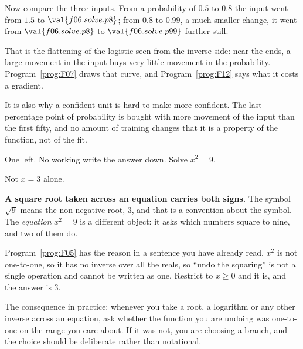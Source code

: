 \begin{fr}
Now compare the three inputs. From a probability of $\num{0.5}$ to
$\num{0.8}$ the input went from $\num{1.5}$ to $\val{f06.solve.p8}$; from
$\num{0.8}$ to $\num{0.99}$, a much smaller change, it went from
$\val{f06.solve.p8}$ to $\val{f06.solve.p99}$ \dash{} further still.

That is the flattening of the logistic seen from the inverse side: near the
ends, a large movement in the input buys very little movement in the
probability. Program~\ref{prog:F07} draws that curve, and
Program~\ref{prog:F12} says what it costs a gradient.

It is also why a confident unit is hard to make more confident. The last
percentage point of probability is bought with more movement of the input than
the first fifty, and no amount of training changes that \dash{} it is a
property of the function, not of the fit.

One left. No working \dash{} write the answer down. Solve $x^{2} = 9$.
\dotline
\nextframe
\end{fr}

\begin{fr}
Not $x = 3$ alone.

\begin{trapbox}
\textbf{A square root taken across an equation carries both signs.} The
symbol $\sqrt{9}$ means the non-negative root, $3$, and that is a convention
about the symbol. The \emph{equation} $x^{2} = 9$ is a different object: it
asks which numbers square to nine, and two of them do.

Program~\ref{prog:F05} has the reason in a sentence you have already read.
$x^{2}$ is not one-to-one, so it has no inverse over all the reals, so
\enquote{undo the squaring} is not a single operation and cannot be written as
one. Restrict to $x \ge 0$ and it is, and the answer is $3$.

The consequence in practice: whenever you take a root, a logarithm or any
other inverse across an equation, ask whether the function you are undoing was
one-to-one on the range you care about. If it was not, you are choosing a
branch, and the choice should be deliberate rather than notational.
\end{trapbox}
\end{fr}


